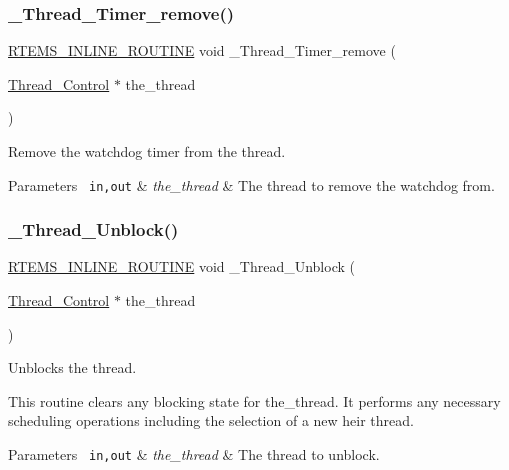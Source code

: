 \subsubsection{\texorpdfstring{\_Thread\_Timer\_remove()}{\_Thread\_Timer\_remove()}}
{\footnotesize\ttfamily \mbox{\hyperlink{group__RTEMSScoreBaseDefs_gac216239df231d5dbd15e3520b0b9313f}{R\+T\+E\+M\+S\+\_\+\+I\+N\+L\+I\+N\+E\+\_\+\+R\+O\+U\+T\+I\+NE}} void \+\_\+\+Thread\+\_\+\+Timer\+\_\+remove (\begin{DoxyParamCaption}\item[{\mbox{\hyperlink{struct__Thread__Control}{Thread\+\_\+\+Control}} $\ast$}]{the\+\_\+thread }\end{DoxyParamCaption})}



Remove the watchdog timer from the thread. 


\begin{DoxyParams}[1]{Parameters}
\mbox{\texttt{ in,out}}  & {\em the\+\_\+thread} & The thread to remove the watchdog from. \\
\hline
\end{DoxyParams}
\mbox{\label{group__RTEMSScoreThread_ga1234634f1d75c8c0864c5727b526f9a3}} 
\subsubsection{\texorpdfstring{\_Thread\_Unblock()}{\_Thread\_Unblock()}}
{\footnotesize\ttfamily \mbox{\hyperlink{group__RTEMSScoreBaseDefs_gac216239df231d5dbd15e3520b0b9313f}{R\+T\+E\+M\+S\+\_\+\+I\+N\+L\+I\+N\+E\+\_\+\+R\+O\+U\+T\+I\+NE}} void \+\_\+\+Thread\+\_\+\+Unblock (\begin{DoxyParamCaption}\item[{\mbox{\hyperlink{struct__Thread__Control}{Thread\+\_\+\+Control}} $\ast$}]{the\+\_\+thread }\end{DoxyParamCaption})}



Unblocks the thread. 

This routine clears any blocking state for the\+\_\+thread. It performs any necessary scheduling operations including the selection of a new heir thread.


\begin{DoxyParams}[1]{Parameters}
\mbox{\texttt{ in,out}}  & {\em the\+\_\+thread} & The thread to unblock. \\
\hline
\end{DoxyParams}
\mbox{\label{group__RTEMSScoreThread_gafc95fd103c5bcd79927f316370080340}} 
